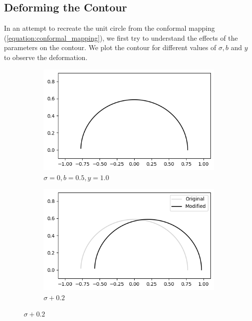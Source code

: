 \documentclass[a4paper]{report}
\begin{document}
\subsection{Deforming the Contour}
In an attempt to recreate the unit circle from the conformal mapping (\ref{equation:conformal_mapping}), we first try to understand the effects of the parameters on the contour. We plot the contour for different values of $\sigma, b$ and $y$ to observe the deformation.

\begin{figure}[ht]
    \begin{subfigure}{.3\linewidth}
      \includegraphics[width=\linewidth]{images/deformations/base.png}
      \caption{$\sigma = 0, b = 0.5, y = 1.0$}
      \label{fig:base_deform}
    \end{subfigure}\hfill
    \begin{subfigure}{.3\linewidth}
      \includegraphics[width=\linewidth]{images/deformations/positive_sigma.png}
      \caption{$\sigma + 0.2$}
      \label{fig:positive_sigma}
    \end{subfigure}\hfill

\end{figure}
\end{document}
